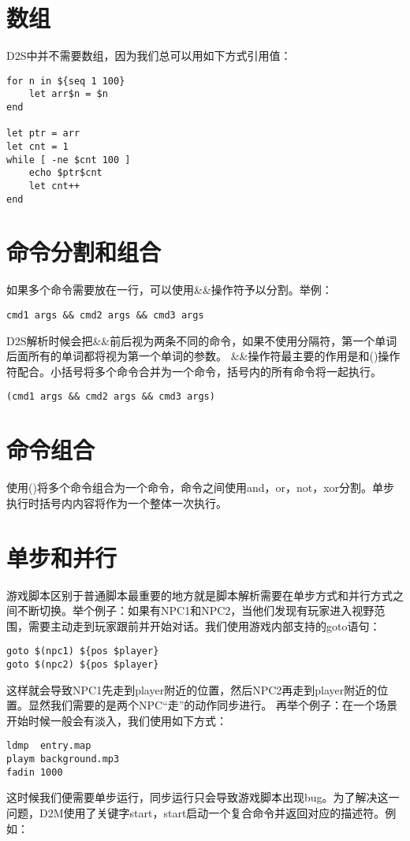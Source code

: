 \section{数组}
D2S中并不需要数组，因为我们总可以用如下方式引用值：

\begin{lstlisting}
for n in ${seq 1 100}
    let arr$n = $n
end

let ptr = arr
let cnt = 1
while [ -ne $cnt 100 ]
    echo $ptr$cnt
    let cnt++
end
\end{lstlisting}
\section{命令分割和组合}
如果多个命令需要放在一行，可以使用\&\&操作符予以分割。举例：
\begin{lstlisting}
cmd1 args && cmd2 args && cmd3 args
\end{lstlisting}
D2S解析时候会把\&\&前后视为两条不同的命令，如果不使用分隔符，第一个单词后面所有的单词都将视为第一个单词的参数。
\&\&操作符最主要的作用是和()操作符配合。小括号将多个命令合并为一个命令，括号内的所有命令将一起执行。
\begin{lstlisting}
(cmd1 args && cmd2 args && cmd3 args)
\end{lstlisting}
\section{命令组合}
使用()将多个命令组合为一个命令，命令之间使用and，or，not，xor分割。单步执行时括号内内容将作为一个整体一次执行。
\section{单步和并行}
游戏脚本区别于普通脚本最重要的地方就是脚本解析需要在单步方式和并行方式之间不断切换。举个例子：如果有NPC1和NPC2，当他们发现有玩家进入视野范围，需要主动走到玩家跟前并开始对话。我们使用游戏内部支持的goto语句：
\begin{lstlisting}
goto $(npc1) ${pos $player}
goto $(npc2) ${pos $player}
\end{lstlisting}
这样就会导致NPC1先走到player附近的位置，然后NPC2再走到player附近的位置。显然我们需要的是两个NPC“走”的动作同步进行。
再举个例子：在一个场景开始时候一般会有淡入，我们使用如下方式：
\begin{lstlisting}
ldmp  entry.map
playm background.mp3
fadin 1000
\end{lstlisting}
这时候我们便需要单步运行，同步运行只会导致游戏脚本出现bug。为了解决这一问题，D2M使用了关键字start，start启动一个复合命令并返回对应的描述符。例如：

